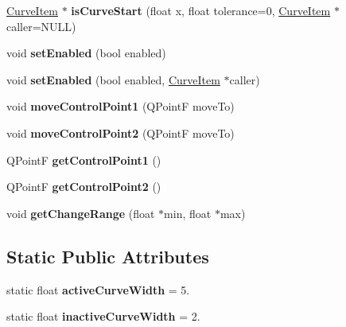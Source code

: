 \begin{DoxyCompactItemize}
\item 
\hypertarget{class_curve_item_a2cc3801f509b83aa12a8126e9cfa701f}{
\hyperlink{class_curve_item}{\-Curve\-Item} $\ast$ {\bfseries is\-Curve\-Start} (float x, float tolerance=0, \hyperlink{class_curve_item}{\-Curve\-Item} $\ast$caller=\-N\-U\-L\-L)}
\label{class_curve_item_a2cc3801f509b83aa12a8126e9cfa701f}

\item 
\hypertarget{class_curve_item_a30603d8e04b3d1a480a6026e42df3fd8}{
void {\bfseries set\-Enabled} (bool enabled)}
\label{class_curve_item_a30603d8e04b3d1a480a6026e42df3fd8}

\item 
\hypertarget{class_curve_item_adbe885d72e38fb9a39ce3e3f8729575d}{
void {\bfseries set\-Enabled} (bool enabled, \hyperlink{class_curve_item}{\-Curve\-Item} $\ast$caller)}
\label{class_curve_item_adbe885d72e38fb9a39ce3e3f8729575d}

\item 
\hypertarget{class_curve_item_a5ddd322756e6e5ce508680aada6e113d}{
void {\bfseries move\-Control\-Point1} (\-Q\-Point\-F move\-To)}
\label{class_curve_item_a5ddd322756e6e5ce508680aada6e113d}

\item 
\hypertarget{class_curve_item_a581449673a7d75249cada7353a9b9d91}{
void {\bfseries move\-Control\-Point2} (\-Q\-Point\-F move\-To)}
\label{class_curve_item_a581449673a7d75249cada7353a9b9d91}

\item 
\hypertarget{class_curve_item_af94192a629fbfadfb38e717066e2deb3}{
\-Q\-Point\-F {\bfseries get\-Control\-Point1} ()}
\label{class_curve_item_af94192a629fbfadfb38e717066e2deb3}

\item 
\hypertarget{class_curve_item_a6bbca83729ad7147d119b4ed9b2ca891}{
\-Q\-Point\-F {\bfseries get\-Control\-Point2} ()}
\label{class_curve_item_a6bbca83729ad7147d119b4ed9b2ca891}

\item 
\hypertarget{class_curve_item_af98b6c314bba5f669e3c93b286d0dfb6}{
void {\bfseries get\-Change\-Range} (float $\ast$min, float $\ast$max)}
\label{class_curve_item_af98b6c314bba5f669e3c93b286d0dfb6}

\end{DoxyCompactItemize}
\subsection*{\-Static \-Public \-Attributes}
\begin{DoxyCompactItemize}
\item 
\hypertarget{class_curve_item_a053e3bd21310fd3b9bf21c73d5db823d}{
static float {\bfseries active\-Curve\-Width} = 5.}
\label{class_curve_item_a053e3bd21310fd3b9bf21c73d5db823d}

\item 
\hypertarget{class_curve_item_ad52ea9ed024b921b2fee6af4cf72a371}{
static float {\bfseries inactive\-Curve\-Width} = 2.}
\label{class_curve_item_ad52ea9ed024b921b2fee6af4cf72a371}

\end{DoxyCompactItemize}
